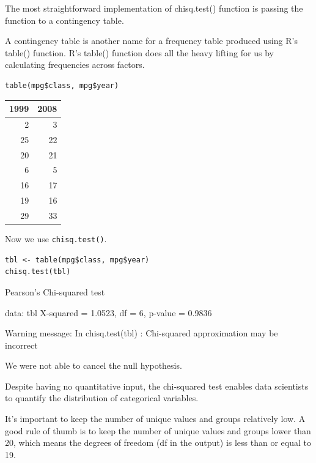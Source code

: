 \documentclass[11pt]{article}
\begin{document}
The most straightforward implementation of chisq.test() function is passing the function to a contingency table.

A contingency table is another name for a frequency table produced using R's table() function. R's table() function does all the heavy lifting for us by calculating frequencies across factors.

\begin{verbatim}
table(mpg$class, mpg$year)
\end{verbatim}

\begin{org}
\begin{center}
\begin{tabular}{rr}
1999 & 2008\\
\hline
2 & 3\\
25 & 22\\
20 & 21\\
6 & 5\\
16 & 17\\
19 & 16\\
29 & 33\\
\end{tabular}
\end{center}
\end{org}

Now we use \texttt{chisq.test()}.

\begin{verbatim}
tbl <- table(mpg$class, mpg$year)
chisq.test(tbl)
\end{verbatim}

\begin{org}


Pearson's Chi-squared test

data:  tbl
X-squared = 1.0523, df = 6, p-value = 0.9836

Warning message:
In chisq.test(tbl) : Chi-squared approximation may be incorrect
\end{org}

We were not able to cancel the null hypothesis.

Despite having no quantitative input, the chi-squared test enables data scientists to quantify the distribution of categorical variables.

It's important to keep the number of unique values and groups relatively low. A good rule of thumb is to keep the number of unique values and groups lower than 20, which means the degrees of freedom (df in the output) is less than or equal to 19.
\end{document}
